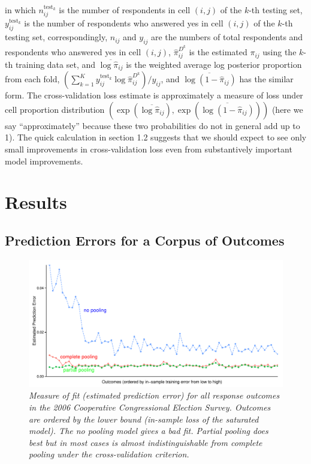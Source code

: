 \documentclass[11pt,article,oneside]{memoir}
\begin{document}
\noindent in which \(n_{ij}^{\text{test}_k}\) is the number of
respondents in cell \((i,j)\) of the \(k\)-th testing set,
\(y_{ij}^{\text{test}_k}\) is the number of respondents who answered yes
in cell \((i,j)\) of the \(k\)-th testing set, correspondingly,
\(n_{ij}\) and \(y_{ij}\) are the numbers of total respondents and
respondents who answered yes in cell \((i,j)\), \(\hat\pi_{ij}^{D^k}\)
is the estimated \(\pi_{ij}\) using the \(k\)-th training data set, and
\(\overline{\log\hat\pi_{ij}}\) is the weighted average log posterior
proportion from each fold,
\(\left(\sum_{k=1}^Ky^{\text{test}_k}_{ij}\log\hat\pi_{ij}^{D^k} \right)\big/y_{ij}\),
and \(\overline{\log(1-\hat\pi_{ij})}\) has the similar form. The
cross-validation loss estimate is approximately a measure of loss under
cell proportion distribution
\((\exp(\overline{\log\hat\pi_{ij}}), \exp(\overline{\log(1-\hat\pi_{ij})}))\)
(here we say ``approximately'' because these two probabilities do not in
general add up to 1). The quick calculation in section 1.2 suggests that
we should expect to see only small improvements in cross-validation loss
even from substantively important model improvements.

\section{Results}\label{results}

\subsection{Prediction Errors for a Corpus of
Outcomes}\label{prediction-errors-for-a-corpus-of-outcomes}

\begin{figure}
  \centering
  \includegraphics[width=.85\textwidth]{alloutcomesx1.pdf}
  \caption{\em Measure of fit (estimated prediction error) for all response outcomes
    in the 2006 Cooperative Congressional Election Survey. Outcomes are ordered by the lower bound
    (in-sample loss of the saturated model). The no pooling model
    gives a bad fit.  Partial pooling does best but in most cases is almost indistinguishable from complete pooling under the cross-validation criterion.}
  \label{fig:figx1}
\end{figure}
\end{document}
